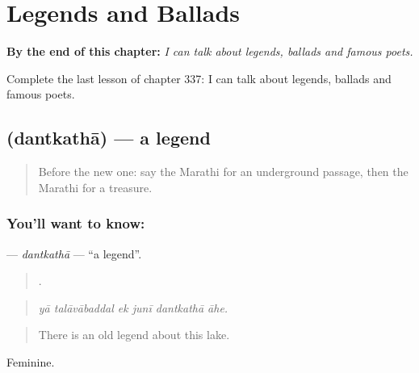 
\chapter{Legends and Ballads}
\label{ch:mr-legends-and-ballads}

\begin{chapteropening}
\textbf{By the end of this chapter:} \emph{I can talk about legends, ballads and famous poets.}

Complete the last lesson of chapter 337: I can talk about legends, ballads and famous poets.
\end{chapteropening}

\section[\texorpdfstring{\mr{दंतकथा} (dantkathā)}{दंतकथा (dantkathā)}]{ (dantkathā) — a legend}

\label{lesson:MR-C337-dantkatha}



\begin{quote}
Before the new one: say the Marathi for an underground passage, then the Marathi for a treasure.
\end{quote}

\subsection*{You'll want to know: }
\textbf{} — \emph{dantkathā} — \textquotedblleft{}a legend\textquotedblright{}.

\begin{quote}
     .
\end{quote}

\begin{quote}
\emph{yā talāvābaddal ek junī dantkathā āhe.}
\end{quote}

\begin{quote}
There is an old legend about this lake.
\end{quote}

Feminine.

